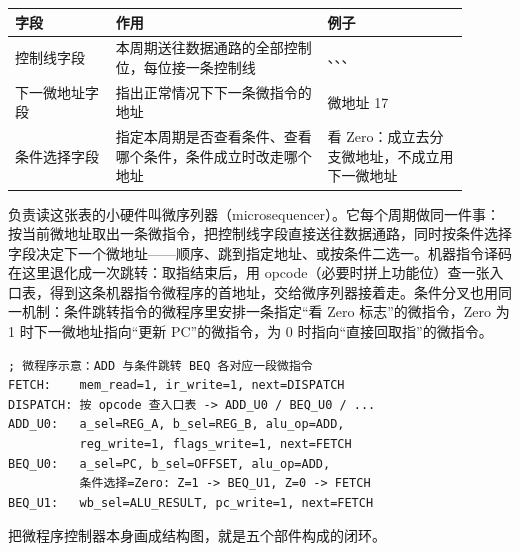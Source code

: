 \begin{longtable}{L{0.2\linewidth}L{0.42\linewidth}L{0.28\linewidth}}
\toprule
字段 & 作用 & 例子 \\
\midrule
控制线字段 & 本周期送往数据通路的全部控制位，每位接一条控制线 & 、、、 \\
下一微地址字段 & 指出正常情况下下一条微指令的地址 &  微地址 17 \\
条件选择字段 & 指定本周期是否查看条件、查看哪个条件，条件成立时改走哪个地址 & 看 Zero：成立去分支微地址，不成立用下一微地址 \\
\bottomrule
\end{longtable}

负责读这张表的小硬件叫微序列器（microsequencer）。它每个周期做同一件事：按当前微地址取出一条微指令，把控制线字段直接送往数据通路，同时按条件选择字段决定下一个微地址——顺序、跳到指定地址、或按条件二选一。机器指令译码在这里退化成一次跳转：取指结束后，用 opcode（必要时拼上功能位）查一张入口表，得到这条机器指令微程序的首地址，交给微序列器接着走。条件分叉也用同一机制：条件跳转指令的微程序里安排一条指定“看 Zero 标志”的微指令，Zero 为 1 时下一微地址指向“更新 PC”的微指令，为 0 时指向“直接回取指”的微指令。

\begin{lstlisting}
; 微程序示意：ADD 与条件跳转 BEQ 各对应一段微指令
FETCH:    mem_read=1, ir_write=1, next=DISPATCH
DISPATCH: 按 opcode 查入口表 -> ADD_U0 / BEQ_U0 / ...
ADD_U0:   a_sel=REG_A, b_sel=REG_B, alu_op=ADD,
          reg_write=1, flags_write=1, next=FETCH
BEQ_U0:   a_sel=PC, b_sel=OFFSET, alu_op=ADD,
          条件选择=Zero: Z=1 -> BEQ_U1, Z=0 -> FETCH
BEQ_U1:   wb_sel=ALU_RESULT, pc_write=1, next=FETCH
\end{lstlisting}

把微程序控制器本身画成结构图，就是五个部件构成的闭环。


